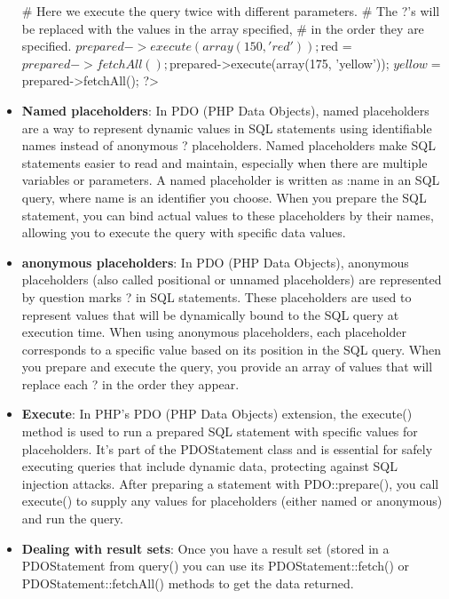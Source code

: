 \documentclass{report}
\begin{document}
\begin{itemize}
\begin{bashcode}
                    # Here we execute the query twice with different parameters.
                    # The ?'s will be replaced with the values in the array specified,
                    # in the order they are specified.
                    $prepared->execute(array(150, 'red'));
                    $red = $prepared->fetchAll();
                    $prepared->execute(array(175, 'yellow'));
                    $yellow = $prepared->fetchAll();
                ?>
            \end{bashcode}
        \item \textbf{Named placeholders}: In PDO (PHP Data Objects), named placeholders are a way to represent dynamic values in SQL statements using identifiable names instead of anonymous ? placeholders. Named placeholders make SQL statements easier to read and maintain, especially when there are multiple variables or parameters.
            \bigbreak \noindent 
            A named placeholder is written as :name in an SQL query, where name is an identifier you choose. When you prepare the SQL statement, you can bind actual values to these placeholders by their names, allowing you to execute the query with specific data values.
        \item \textbf{anonymous placeholders}: In PDO (PHP Data Objects), anonymous placeholders (also called positional or unnamed placeholders) are represented by question marks ? in SQL statements. These placeholders are used to represent values that will be dynamically bound to the SQL query at execution time.
            \bigbreak \noindent 
            When using anonymous placeholders, each placeholder corresponds to a specific value based on its position in the SQL query. When you prepare and execute the query, you provide an array of values that will replace each ? in the order they appear.
        \item \textbf{Execute}: In PHP's PDO (PHP Data Objects) extension, the execute() method is used to run a prepared SQL statement with specific values for placeholders. It's part of the PDOStatement class and is essential for safely executing queries that include dynamic data, protecting against SQL injection attacks.
            \bigbreak \noindent 
            After preparing a statement with PDO::prepare(), you call execute() to supply any values for placeholders (either named or anonymous) and run the query.
        \item \textbf{Dealing with result sets}: Once you have a result set (stored in a PDOStatement from query() you can use its PDOStatement::fetch() or PDOStatement::fetchAll() methods to get the data returned.

\end{itemize}
\end{document}
